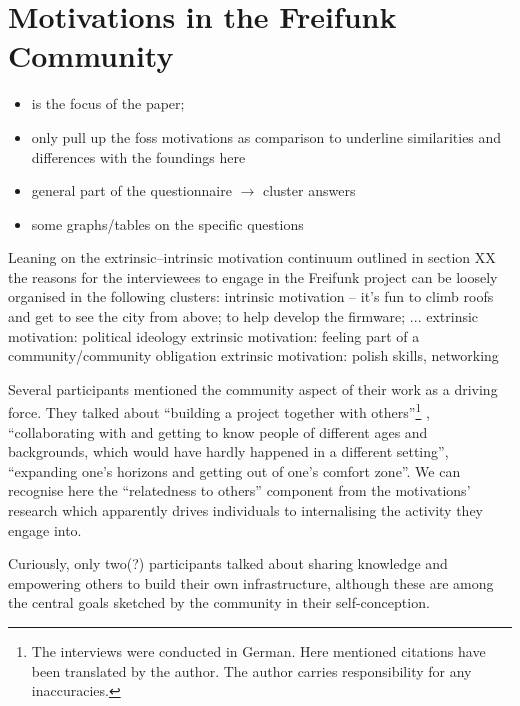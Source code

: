 \section{Motivations in the Freifunk Community}

\begin{itemize}
  \item is the focus of the paper;
  \item only pull up the foss motivations as comparison to underline similarities and differences with the foundings here
  \item general part of the questionnaire $\rightarrow$ cluster answers
  \item some graphs/tables on the specific questions
\end{itemize}

Leaning on the extrinsic--intrinsic motivation continuum outlined in section XX the reasons for the interviewees to engage in the Freifunk project can be loosely organised in the following clusters:
intrinsic motivation -- it's fun to climb roofs and get to see the city from above; to help develop the firmware; ...
extrinsic motivation: political ideology
extrinsic motivation: feeling part of a community/community obligation
extrinsic motivation: polish skills, networking




Several participants mentioned the community aspect of their work as a driving force.
They talked about ``building a project together with others''\footnote{The interviews were conducted in German. Here mentioned citations have been translated by the author. The author carries responsibility for any inaccuracies.}
, ``collaborating with and getting to know people of different ages and backgrounds, which would have hardly happened in a different setting'', ``expanding one's horizons and getting out of one's comfort zone''.
We can recognise here the ``relatedness to others'' component from the motivations' research which apparently drives individuals to internalising the activity they engage into.

Curiously, only two(?) participants talked about sharing knowledge and empowering others to build their own infrastructure, although these are among the central goals sketched by the community in their self-conception\cite{ffweb}.


